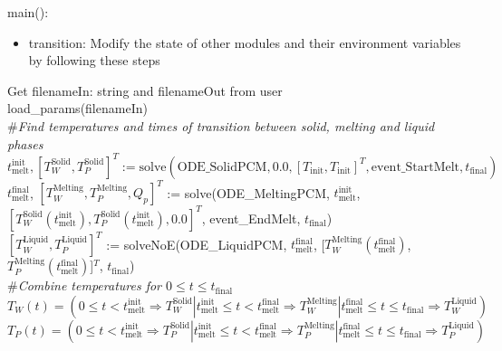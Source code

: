 \documentclass[12pt, titlepage]{article}
\begin{document}
\noindent main():
\begin{itemize}
\item transition: Modify the state of other modules and their
  environment variables by following these steps\\
\end{itemize}

\noindent Get filenameIn: string and filenameOut from user\\

\noindent load\_params(filenameIn)\\

\noindent \#\textit{Find temperatures and times of transition between solid,
  melting and liquid phases}\\

\noindent $t_\text{melt}^\text{init}, [T_W^{\text{Solid}}, T_P^{\text{Solid}}]^T := \text{solve}(\text{ODE\_SolidPCM}, 0.0,
[T_\text{init}, T_\text{init}]^T, \text{event\_StartMelt} , t_\text{final})$\\

\noindent $t_\text{melt}^\text{final}$, $[T_W^{\text{Melting}},
T_P^{\text{Melting}}, Q_p]^T$ := solve(ODE\_MeltingPCM,
$t_\text{melt}^\text{init}$, $[T_W^{\text{Solid}}(t_\text{melt}^\text{init}),
  T_P^{\text{Solid}}(t_\text{melt}^\text{init}), 0.0]^T$,
  event\_EndMelt, $t_\text{final}$)\\

\noindent $[ T_W^{\text{Liquid}}, T_P^{\text{Liquid}}]^T$ := solveNoE(ODE\_LiquidPCM, $t_\text{melt}^\text{final}$,
[$T_W^{\text{Melting}}(t_\text{melt}^\text{final})$,
$T_P^{\text{Melting}}(t_\text{melt}^\text{final})$]$^T$, $t_\text{final}$)\\

\noindent \#\textit{Combine temperatures for $0 \leq t \leq t_\text{final}$}\\

\noindent $T_W(t) = (0 \leq t < t_\text{melt}^{\text{init}} \Rightarrow
T_W^{\text{Solid}} | t_\text{melt}^{\text{init}} \leq t <
t_\text{melt}^{\text{final}} \Rightarrow T_W^{\text{Melting}} |
t_\text{melt}^{\text{final}} \leq t \leq
t_\text{final} \Rightarrow T_W^{\text{Liquid}} )$\\

\noindent $T_P(t) = (0 \leq t < t_\text{melt}^{\text{init}} \Rightarrow
T_P^{\text{Solid}} | t_\text{melt}^{\text{init}} \leq t <
t_\text{melt}^{\text{final}} \Rightarrow T_P^{\text{Melting}} | t_\text{melt}^{\text{final}} \leq t \leq
t_\text{final} \Rightarrow T_P^{\text{Liquid}} )$\\
\end{document}
